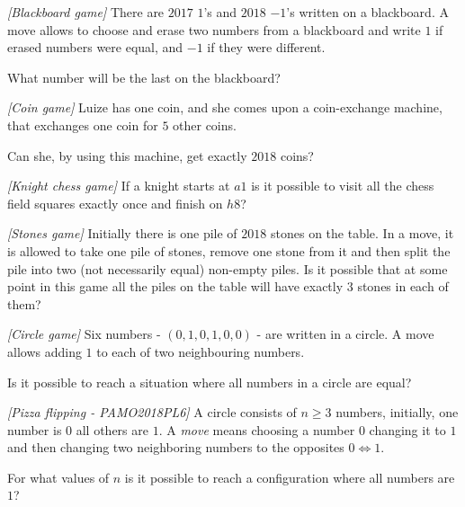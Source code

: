 

%




\noindent 



\begin{problem}
\textit{[Blackboard game]}
There are $2017$ $1$'s and $2018$ $-1$'s written on a blackboard. A move allows to choose and erase two numbers from a blackboard and write $1$ if erased numbers were equal, and $-1$ if they were different. 

What number will be the last on the blackboard?
\end{problem}
%

\begin{problem}
\textit{[Coin game]}
Luize has one coin, and she comes upon a coin-exchange machine, that exchanges one coin for $5$ other coins. 

Can she, by using this machine, get exactly $2018$ coins? 
\end{problem}
%

\begin{problem}
\textit{[Knight chess game]}
If a knight starts at $a1$ is it possible to visit all the chess field squares exactly once and finish on $h8$?
\end{problem}
%

\begin{problem}
\textit{[Stones game]}
Initially there is one pile of $2018$ stones on the table. In a move, it is allowed to take one pile of stones, remove one stone from it and then split the pile into two (not necessarily equal) non-empty piles. 
Is it possible that at some point in this game all the piles on the table will have exactly $3$ stones in each of them?
\end{problem}
%

\begin{problem}
\textit{[Circle game]}
Six numbers - $(0,1,0,1,0,0)$ - are written in a circle. A move allows adding $1$ to each of two neighbouring numbers. 

Is it possible to reach a situation where all numbers in a circle are equal?
\end{problem}
%

\begin{problem}
\textit{[Pizza flipping - PAMO2018PL6]}
A circle consists of $n\ge3$ numbers, initially, one number is $0$ all others are $1$. A \textit{move} means choosing a number $0$ changing it to $1$ and then changing two neighboring numbers to the opposites $0\Leftrightarrow1$.

For what values of $n$ is it possible to reach a configuration where all numbers are $1$?
\end{problem}
%

